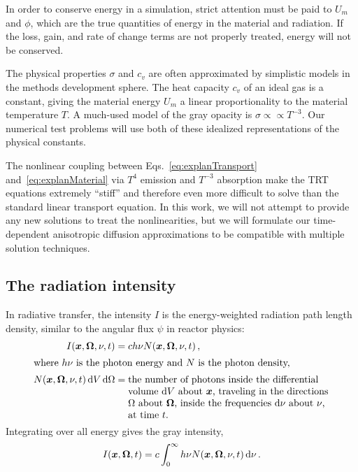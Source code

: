 In order to conserve energy in a simulation, strict attention must be paid to
$U_m$ and $\phi$, which are the true quantities of energy in
the material and radiation. If the loss, gain, and rate of change terms are not
properly treated, energy will not be conserved.

The physical properties $\sigma$ and $c_v$ are often approximated by simplistic
models in the methods development sphere. The heat capacity $c_v$ of an ideal
gas is a constant, giving the material energy $U_m$ a linear proportionality to
the material temperature $T$. A much-used model \cite{Mou2006,Wol2008} of the
gray opacity is $\sigma \propto \propto T^{-3}$.
Our numerical test problems will use both of these idealized representations of
the physical constants.

The nonlinear coupling between Eqs.~\eqref{eq:explanTransport}
and~\eqref{eq:explanMaterial} via $T^4$ emission and $T^{-3}$ absorption make
the TRT equations extremely ``stiff'' \cite{Kno2003} and therefore even more
difficult to solve than the standard linear transport equation. In this work,
we will not attempt to provide any new solutions to treat the nonlinearities,
but we will formulate our time-dependent anisotropic diffusion approximations to
be compatible with multiple solution techniques.

\subsection{The radiation intensity}

In radiative transfer, the intensity $I$ is the energy-weighted radiation path
length density, similar to the angular flux $\psi$ in reactor physics:
\begin{align*}
  I(\vec{x},\vec{\Omega},\nu, t) &= c h\nu N(\vec{x},\vec{\Omega},\nu, t)\,,
  \\
  \intertext{where $h\nu$ is the photon energy and $N$ is the photon density,}
  N(\vec{x},\vec{\Omega}, \nu, t) \ud V \ud \Omega
  &= \topbox{the number of photons inside the differential volume $\ud V$
  about $\vec{x}$, traveling in the directions $\Omega$ about
  $\vec{\Omega}$, inside the frequencies $\ud \nu$ about $\nu$, at time $t$.}
\end{align*}
Integrating over all energy gives the gray intensity,
\begin{equation*}
  I(\bm{x},\bm{\Omega}, t)
  = c \int_0^\infty h\nu N(\bm{x},\bm{\Omega},\nu, t) \mathop{}\!\mathrm{d}\nu \,.
\end{equation*}

